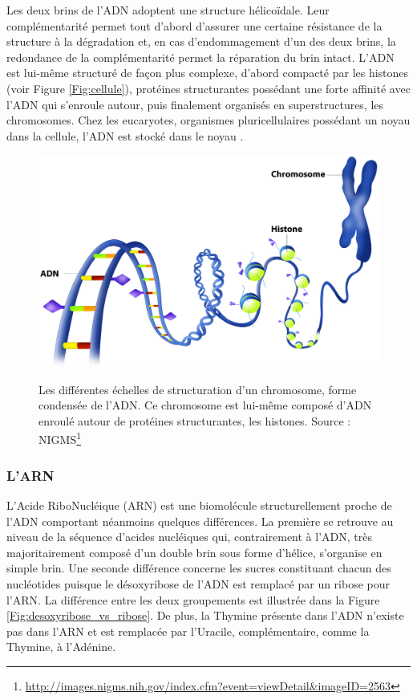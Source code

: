 Les deux brins de l'ADN adoptent une structure hélicoïdale. Leur complémentarité permet tout d'abord d'assurer une certaine résistance de la structure à la dégradation et, en cas d'endommagement d'un des deux brins, la redondance de la complémentarité permet la réparation du brin intact.
L'ADN est lui-même structuré de façon plus complexe, d'abord compacté par les histones (voir Figure \ref{Fig:cellule}), protéines structurantes possédant une forte affinité avec l'ADN qui s'enroule autour, puis finalement organisés en superstructures, les chromosomes. 
Chez les eucaryotes, organismes pluricellulaires possédant un noyau dans la cellule, l'ADN est stocké dans le noyau \cite{johnson2011biologie}. 


\begin{figure}[htb]
 \centering
 {\includegraphics[width=0.6\linewidth]{./figures/ch1/chromosome_adn_horizontal.pdf}}
   \caption[Echelles de structuration du chromosome à l'ADN]{Les différentes échelles de structuration d'un chromosome, forme condensée de l'ADN. Ce chromosome est lui-même composé d'ADN enroulé autour de protéines structurantes, les histones. Source : NIGMS\footnote{\url{http://images.nigms.nih.gov/index.cfm?event=viewDetail&imageID=2563}}}
   \label{Fig:chromosome_adn_2}
  \hspace{0.2cm}
\end{figure}


\subsubsection{L'ARN}

L'Acide RiboNucléique (ARN) est une biomolécule structurellement proche de l'ADN comportant néanmoins quelques différences. La première se retrouve au niveau de la séquence d'acides nucléiques qui, contrairement à l'ADN, très majoritairement composé d'un double brin sous forme d'hélice, s'organise en simple brin. Une seconde différence concerne les sucres constituant chacun des nucléotides puisque le désoxyribose de l'ADN est remplacé par un ribose pour l'ARN. La différence entre les deux groupements est illustrée dans la Figure \ref{Fig:desoxyribose_vs_ribose}. De plus, la Thymine présente dans l'ADN n'existe pas dans l'ARN et est remplacée par l'Uracile, complémentaire, comme la Thymine, à l'Adénine.

